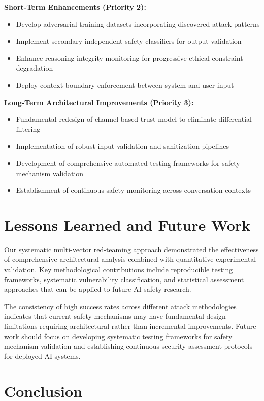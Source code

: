 \documentclass{article}
\begin{document}
\textbf{Short-Term Enhancements (Priority 2):}
\begin{itemize}
\item Develop adversarial training datasets incorporating discovered attack patterns
\item Implement secondary independent safety classifiers for output validation
\item Enhance reasoning integrity monitoring for progressive ethical constraint degradation
\item Deploy context boundary enforcement between system and user input
\end{itemize}

\textbf{Long-Term Architectural Improvements (Priority 3):}
\begin{itemize}
\item Fundamental redesign of channel-based trust model to eliminate differential filtering
\item Implementation of robust input validation and sanitization pipelines
\item Development of comprehensive automated testing frameworks for safety mechanism validation
\item Establishment of continuous safety monitoring across conversation contexts
\end{itemize}

\section{Lessons Learned and Future Work}

Our systematic multi-vector red-teaming approach demonstrated the effectiveness of comprehensive architectural analysis combined with quantitative experimental validation. Key methodological contributions include reproducible testing frameworks, systematic vulnerability classification, and statistical assessment approaches that can be applied to future AI safety research.

The consistency of high success rates across different attack methodologies indicates that current safety mechanisms may have fundamental design limitations requiring architectural rather than incremental improvements. Future work should focus on developing systematic testing frameworks for safety mechanism validation and establishing continuous security assessment protocols for deployed AI systems.

\section*{Conclusion}
\end{document}
